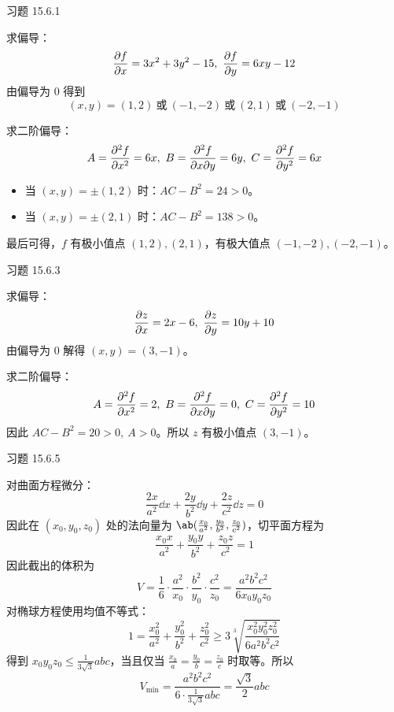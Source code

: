 \begin{problem}
    习题 15.6.1
    \begin{solution}
        求偏导：
        $$
        \pdv{f}{x} = 3x^2 + 3y^2 - 15,\ \pdv{f}{y} = 6xy - 12
        $$
        由偏导为 $0$ 得到
        $$
        (x, y) = (1, 2)\ \text{或}\ (-1, -2)\ \text{或}\ (2, 1)\ \text{或}\ (-2, -1)
        $$

        求二阶偏导：
        $$
        A = \pdv[2]{f}{x} = 6x,\ B = \pdv[2]{f}{x}{y} = 6y,\ C = \pdv[2]{f}{y} = 6x
        $$
        \begin{itemize}
            \item 当 $(x, y) = \pm (1, 2)$ 时：$AC - B^2 = 24 > 0$。
            \item 当 $(x, y) = \pm (2, 1)$ 时：$AC - B^2 = 138 > 0$。
        \end{itemize}
        最后可得，$f$ 有极小值点 $(1, 2), (2, 1)$，有极大值点 $(-1, -2), (-2, -1)$。
    \end{solution}
\end{problem}

\begin{problem}
    习题 15.6.3
    \begin{solution}
        求偏导：
        $$
        \pdv{z}{x} = 2x - 6,\ \pdv{z}{y} = 10y + 10
        $$
        由偏导为 $0$ 解得 $(x, y) = (3, -1)$。

        求二阶偏导：
        $$
        A = \pdv[2]{f}{x} = 2,\ B = \pdv[2]{f}{x}{y} = 0,\ C = \pdv[2]{f}{y} = 10
        $$
        因此 $AC - B^2 = 20 > 0,\ A > 0$。所以 $z$ 有极小值点 $(3, -1)$。
    \end{solution}
\end{problem}

\begin{problem}
    习题 15.6.5
    \begin{solution}
        对曲面方程微分：
        $$
        \frac{2x}{a^2} \dd{x} + \frac{2y}{b^2} \dd{y} + \frac{2z}{c^2} \dd{z} = 0
        $$
        因此在 $(x_0, y_0, z_0)$ 处的法向量为 $\ab(\frac{x_0}{a^2}, \frac{y_0}{b^2}, \frac{z_0}{c^2})$，切平面方程为
        $$
        \frac{x_0 x}{a^2} + \frac{y_0 y}{b^2} + \frac{z_0 z}{c^2} = 1
        $$
        因此截出的体积为
        $$
        V = \frac{1}{6} \cdot \frac{a^2}{x_0} \cdot \frac{b^2}{y_0} \cdot \frac{c^2}{z_0} = \frac{a^2 b^2 c^2}{6 x_0 y_0 z_0}
        $$
        对椭球方程使用均值不等式：
        $$
        1 = \frac{x_0^2}{a^2} + \frac{y_0^2}{b^2} + \frac{z_0^2}{c^2} \ge 3 \sqrt[3]{\frac{x_0^2 y_0^2 z_0^2}{6 a^2 b^2 c^2}}
        $$
        得到 $x_0 y_0 z_0 \le \frac{1}{3 \sqrt{3}} a b c$，当且仅当 $\frac{x_0}{a} = \frac{y_0}{b} = \frac{z_0}{c}$ 时取等。所以
        $$
        V_{\min} = \frac{a^2 b^2 c^2}{6 \cdot \frac{1}{3 \sqrt{3}} a b c} = \frac{\sqrt{3}}{2} a b c
        $$
    \end{solution}
\end{problem}

